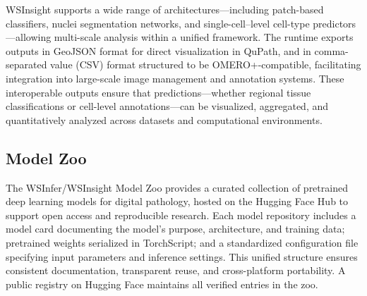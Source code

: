 \documentclass[sn-mathphys-num]{sn-jnl}%
\theoremstyle{thmstyleone}%
\theoremstyle{thmstyletwo}%
\theoremstyle{thmstylethree}%
\begin{document}
	WSInsight supports a wide range of architectures—including patch-based classifiers, nuclei segmentation networks, and single-cell–level cell-type predictors—allowing multi-scale analysis within a unified framework. 
	The runtime exports outputs in GeoJSON format for direct visualization in QuPath, and in comma-separated value (CSV) format structured to be OMERO+-compatible, facilitating integration into large-scale image management and annotation systems. These interoperable outputs ensure that predictions—whether regional tissue classifications or cell-level annotations—can be visualized, aggregated, and quantitatively analyzed across datasets and computational environments.
	
%	
%	
%	
	
	\subsection{Model Zoo}
	
	The WSInfer/WSInsight Model Zoo provides a curated collection of pretrained deep learning models for digital pathology, hosted on the Hugging Face Hub to support open access and reproducible research. Each model repository includes a model card documenting the model’s purpose, architecture, and training data; pretrained weights serialized in TorchScript; and a standardized configuration file specifying input parameters and inference settings. This unified structure ensures consistent documentation, transparent reuse, and cross-platform portability. A public registry on Hugging Face maintains all verified entries in the zoo.
\end{document}
